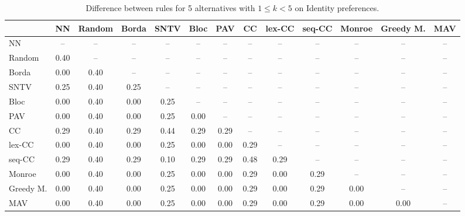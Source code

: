 
\begin{table*}[htbp]
\centering
\begin{tabular}{lcccccccccccc}
\toprule
 & NN & Random & Borda & SNTV & Bloc & PAV & CC & lex-CC & seq-CC & Monroe & Greedy M. & MAV \\
\midrule
NN & -- & -- & -- & -- & -- & -- & -- & -- & -- & -- & -- & -- \\
Random & \cellcolor{blue!40} 0.40 & -- & -- & -- & -- & -- & -- & -- & -- & -- & -- & -- \\
Borda & \cellcolor{blue!0} 0.00 & \cellcolor{blue!40} 0.40 & -- & -- & -- & -- & -- & -- & -- & -- & -- & -- \\
SNTV & \cellcolor{blue!25} 0.25 & \cellcolor{blue!40} 0.40 & \cellcolor{blue!25} 0.25 & -- & -- & -- & -- & -- & -- & -- & -- & -- \\
Bloc & \cellcolor{blue!0} 0.00 & \cellcolor{blue!40} 0.40 & \cellcolor{blue!0} 0.00 & \cellcolor{blue!25} 0.25 & -- & -- & -- & -- & -- & -- & -- & -- \\
PAV & \cellcolor{blue!0} 0.00 & \cellcolor{blue!40} 0.40 & \cellcolor{blue!0} 0.00 & \cellcolor{blue!25} 0.25 & \cellcolor{blue!0} 0.00 & -- & -- & -- & -- & -- & -- & -- \\
CC & \cellcolor{blue!28} 0.29 & \cellcolor{blue!40} 0.40 & \cellcolor{blue!28} 0.29 & \cellcolor{blue!44} 0.44 & \cellcolor{blue!28} 0.29 & \cellcolor{blue!28} 0.29 & -- & -- & -- & -- & -- & -- \\
lex-CC & \cellcolor{blue!0} 0.00 & \cellcolor{blue!40} 0.40 & \cellcolor{blue!0} 0.00 & \cellcolor{blue!25} 0.25 & \cellcolor{blue!0} 0.00 & \cellcolor{blue!0} 0.00 & \cellcolor{blue!28} 0.29 & -- & -- & -- & -- & -- \\
seq-CC & \cellcolor{blue!28} 0.29 & \cellcolor{blue!40} 0.40 & \cellcolor{blue!28} 0.29 & \cellcolor{blue!10} 0.10 & \cellcolor{blue!28} 0.29 & \cellcolor{blue!28} 0.29 & \cellcolor{blue!48} 0.48 & \cellcolor{blue!28} 0.29 & -- & -- & -- & -- \\
Monroe & \cellcolor{blue!0} 0.00 & \cellcolor{blue!40} 0.40 & \cellcolor{blue!0} 0.00 & \cellcolor{blue!25} 0.25 & \cellcolor{blue!0} 0.00 & \cellcolor{blue!0} 0.00 & \cellcolor{blue!28} 0.29 & \cellcolor{blue!0} 0.00 & \cellcolor{blue!28} 0.29 & -- & -- & -- \\
Greedy M. & \cellcolor{blue!0} 0.00 & \cellcolor{blue!40} 0.40 & \cellcolor{blue!0} 0.00 & \cellcolor{blue!25} 0.25 & \cellcolor{blue!0} 0.00 & \cellcolor{blue!0} 0.00 & \cellcolor{blue!28} 0.29 & \cellcolor{blue!0} 0.00 & \cellcolor{blue!28} 0.29 & \cellcolor{blue!0} 0.00 & -- & -- \\
MAV & \cellcolor{blue!0} 0.00 & \cellcolor{blue!40} 0.40 & \cellcolor{blue!0} 0.00 & \cellcolor{blue!25} 0.25 & \cellcolor{blue!0} 0.00 & \cellcolor{blue!0} 0.00 & \cellcolor{blue!28} 0.29 & \cellcolor{blue!0} 0.00 & \cellcolor{blue!28} 0.29 & \cellcolor{blue!0} 0.00 & \cellcolor{blue!0} 0.00 & -- \\
\bottomrule
\end{tabular}

\caption{Difference between rules for 5 alternatives with $1 \leq k < 5$ on Identity preferences.}
\label{tab:rule_distance_heatmap-m=[5]-pref_dist=identity}
\end{table*}
    